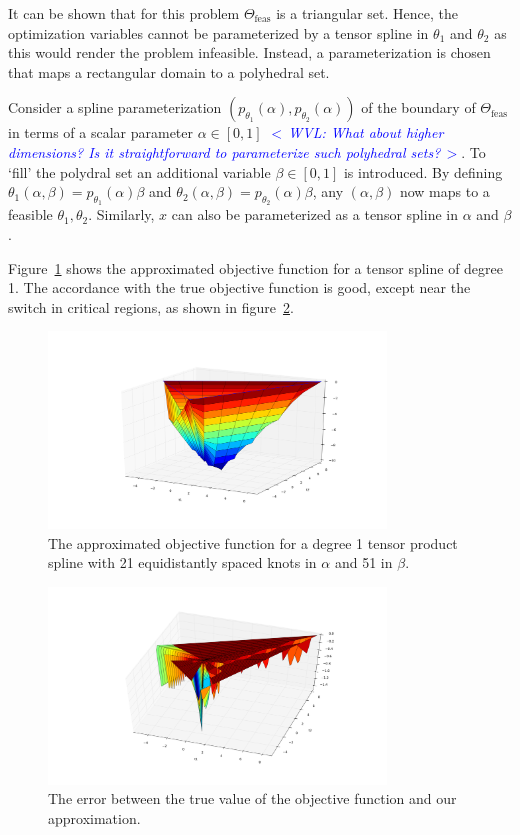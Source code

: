 \documentclass{article}
\newcommand{\ppar}{\theta}                  %
\newcommand{\Ppar}{\Theta}                  %
\newcommand{\commentWVL}[1]{\noindent \textcolor{blue}{\emph{$<\,$WVL: #1$\,>$}}}%
\begin{document}
It can be shown that for this problem $\Ppar_\text{feas}$ is a triangular set.
Hence, the optimization variables cannot be parameterized by a tensor spline
in $\theta_1$ and $\theta_2$ as this would render the problem infeasible.
Instead, a parameterization is chosen that maps a rectangular domain to a
polyhedral set.

Consider a spline parameterization $(p_{\ppar_1}(\alpha),
p_{\ppar_2}(\alpha))$ of the boundary of $\Ppar_\text{feas}$ in terms of a
scalar parameter $\alpha \in [0, 1]$ \commentWVL{What about higher dimensions?
Is it straightforward to parameterize such polyhedral sets?}. To `fill' the
polydral set an additional variable $\beta \in [0, 1]$ is introduced. By
defining $\ppar_1(\alpha,\beta) = p_{\ppar_1}(\alpha) \beta$ and
$\ppar_2(\alpha,\beta) = p_{\ppar_2}(\alpha) \beta$, any $(\alpha, \beta)$ now
maps to a feasible $\ppar_1, \ppar_2$. Similarly, $x$ can also be
parameterized as a tensor spline in $\alpha$ and $\beta$.

Figure~\ref{fig:mplp_objective} shows the approximated objective function for
a tensor spline of degree 1. The accordance with the true objective function
is good, except near the switch in critical regions, as shown in
figure~\ref{fig:mplp_error}.

\begin{figure}
\centering
\includegraphics[width=0.8\textwidth]{figures/mplp_poly_objective.png}
\caption{The approximated objective function for a degree 1 tensor product
spline with 21 equidistantly spaced knots in $\alpha$ and 51 in $\beta$.}
\label{fig:mplp_objective}
\end{figure}

\begin{figure}
\centering
\includegraphics[width=0.8\textwidth]{figures/mplp_poly_error.png}
\caption{The error between the true value of the objective function and our
approximation.}
\label{fig:mplp_error}
\end{figure}




\end{document}
